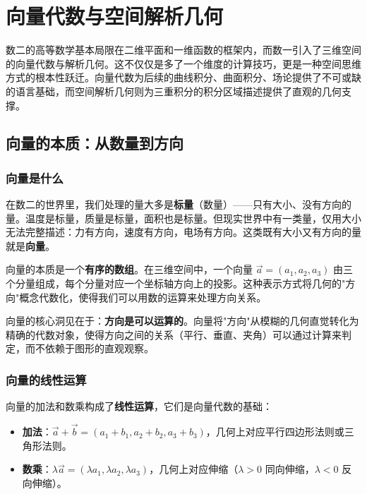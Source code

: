 
\section{向量代数与空间解析几何}

数二的高等数学基本局限在二维平面和一维函数的框架内，而数一引入了三维空间的向量代数与解析几何。这不仅仅是多了一个维度的计算技巧，更是一种空间思维方式的根本性跃迁。向量代数为后续的曲线积分、曲面积分、场论提供了不可或缺的语言基础，而空间解析几何则为三重积分的积分区域描述提供了直观的几何支撑。

\subsection{向量的本质：从数量到方向}

\subsubsection{向量是什么}

在数二的世界里，我们处理的量大多是\textbf{标量}（数量）——只有大小、没有方向的量。温度是标量，质量是标量，面积也是标量。但现实世界中有一类量，仅用大小无法完整描述：力有方向，速度有方向，电场有方向。这类既有大小又有方向的量就是\textbf{向量}。

向量的本质是一个\textbf{有序的数组}。在三维空间中，一个向量 $\vec{a} = (a_1, a_2, a_3)$ 由三个分量组成，每个分量对应一个坐标轴方向上的投影。这种表示方式将几何的"方向"概念代数化，使得我们可以用数的运算来处理方向关系。

\begin{essencebox}
向量的核心洞见在于：\textbf{方向是可以运算的}。向量将"方向"从模糊的几何直觉转化为精确的代数对象，使得方向之间的关系（平行、垂直、夹角）可以通过计算来判定，而不依赖于图形的直观观察。
\end{essencebox}

\subsubsection{向量的线性运算}

向量的加法和数乘构成了\textbf{线性运算}，它们是向量代数的基础：

\begin{itemize}[leftmargin=2em]
    \item \textbf{加法}：$\vec{a} + \vec{b} = (a_1+b_1, a_2+b_2, a_3+b_3)$，几何上对应平行四边形法则或三角形法则。
    \item \textbf{数乘}：$\lambda\vec{a} = (\lambda a_1, \lambda a_2, \lambda a_3)$，几何上对应伸缩（$\lambda > 0$ 同向伸缩，$\lambda < 0$ 反向伸缩）。
\end{itemize}

